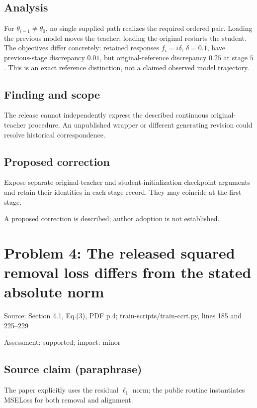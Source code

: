 \documentclass[11pt]{article}
\begin{document}
\subsection*{Analysis}

For \(\theta_{i-1}\ne\theta_0\), no single supplied path realizes the required ordered pair. Loading the previous model moves the teacher; loading the original restarts the student. The objectives differ concretely: retained responses \(f_i=i\delta\), \(\delta=0.1\), have previous-stage discrepancy \(0.01\), but original-reference discrepancy \(0.25\) at stage \(5\). This is an exact reference distinction, not a claimed observed model trajectory.

\subsection*{Finding and scope}

The release cannot independently express the described continuous original-teacher procedure. An unpublished wrapper or different generating revision could resolve historical correspondence.

\subsection*{Proposed correction}

Expose separate original-teacher and student-initialization checkpoint arguments and retain their identities in each stage record. They may coincide at the first stage.

A proposed correction is described; author adoption is not established.

\section*{Problem 4: The released squared removal loss differs from the stated absolute norm}

Source: Section 4.1, Eq.(3), PDF p.4; train-scripts/train-ccrt.py, lines 185 and 225–229

Assessment: supported; impact: minor

\subsection*{Source claim (paraphrase)}

The paper explicitly uses the residual \(\ell_1\) norm; the public routine instantiates MSELoss for both removal and alignment.
\end{document}
